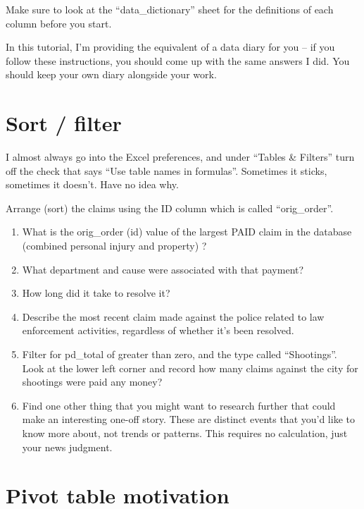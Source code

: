 \documentclass[
  letterpaper,
  DIV=11,
  numbers=noendperiod]{scrreprt}
\begin{document}
Make sure to look at the ``data\_dictionary'' sheet for the definitions
of each column before you start.

In this tutorial, I'm providing the equivalent of a data diary for you
-- if you follow these instructions, you should come up with the same
answers I did. You should keep your own diary alongside your work.

\hypertarget{sort-filter}{%
\section{Sort / filter}\label{sort-filter}}

I almost always go into the Excel preferences, and under ``Tables \&
Filters'' turn off the check that says ``Use table names in formulas''.
Sometimes it sticks, sometimes it doesn't. Have no idea why.

Arrange (sort) the claims using the ID column which is called
``orig\_order''.

\begin{enumerate}
\def\labelenumi{\arabic{enumi}.}
\item
  What is the orig\_order (id) value of the largest PAID claim in the
  database (combined personal injury and property) ?
\item
  What department and cause were associated with that payment?
\item
  How long did it take to resolve it?
\item
  Describe the most recent claim made against the police related to law
  enforcement activities, regardless of whether it's been resolved.
\item
  Filter for pd\_total of greater than zero, and the type called
  ``Shootings''. Look at the lower left corner and record how many
  claims against the city for shootings were paid any money?
\item
  Find one other thing that you might want to research further that
  could make an interesting one-off story. These are distinct events
  that you'd like to know more about, not trends or patterns. This
  requires no calculation, just your news judgment.
\end{enumerate}

\hypertarget{pivot-table-motivation}{%
\section{Pivot table motivation}\label{pivot-table-motivation}}
\end{document}
